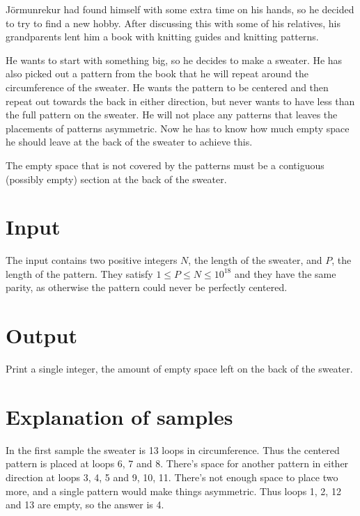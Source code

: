 
Jörmunrekur had found himself with some extra time on his hands, so he
decided to try to find a new hobby. After discussing this with some of
his relatives, his grandparents lent him a book with knitting guides and
knitting patterns.

He wants to start with something big, so he decides to make
a sweater. He has also picked out a pattern from the book that he will 
repeat around the circumference of the sweater.
He wants the pattern to be centered
and then repeat out towards the back in either direction, but never wants to have
less than the full pattern on the sweater. He will not place any patterns that
leaves the placements of patterns asymmetric. Now he has to
know how much empty space he should leave at the back of the sweater to
achieve this.

The empty space that is not covered by the patterns must be a contiguous (possibly empty) 
section at the back of the sweater.

\section*{Input}

The input contains two positive integers $N$, the length of the sweater,
and $P$, the length of the pattern. They satisfy $1 \leq P \leq N \leq
10^{18}$ and they have the same parity, as otherwise the pattern could
never be perfectly centered.

\section*{Output}

Print a single integer, the amount of empty space left on the back of the
sweater.

\pagebreak

\section*{Explanation of samples}

In the first sample the sweater is 13 loops in circumference. Thus the centered
pattern is placed at loops 6, 7 and 8. There's space for another pattern in either
direction at loops 3, 4, 5 and 9, 10, 11. There's not enough space to place two more,
and a single pattern would make things asymmetric. Thus loops 1, 2, 12 and 13 are empty,
so the answer is 4.

